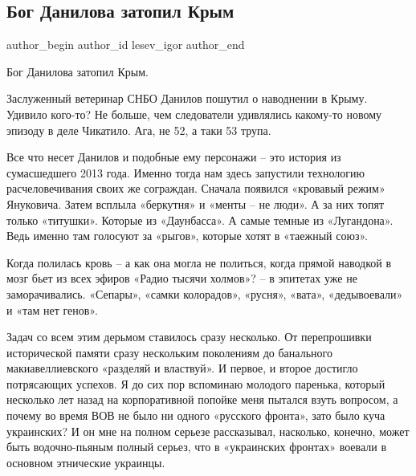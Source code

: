  
 
 
 
 
 
\subsection{Бог Данилова затопил Крым}
\label{sec:20_06_2021.fb.lesev_igor.1.bog_danilova_krym}
\ifcmt
 author_begin
   author_id lesev_igor
 author_end
\fi

Бог Данилова затопил Крым.

Заслуженный ветеринар СНБО Данилов пошутил о наводнении в Крыму. Удивило
кого-то? Не больше, чем следователи удивлялись какому-то новому эпизоду в деле
Чикатило. Ага, не 52, а таки 53 трупа.

Все что несет Данилов и подобные ему персонажи – это история из сумасшедшего
2013 года. Именно тогда нам здесь запустили технологию расчеловечивания своих
же сограждан. Сначала появился «кровавый режим» Януковича. Затем всплыла
«беркутня» и «менты – не люди». А за них топят только «титушки». Которые из
«Даунбасса». А самые темные из «Лугандона». Ведь именно там голосуют за
«рыгов», которые хотят в «таежный союз».

Когда полилась кровь – а как она могла не политься, когда прямой наводкой в
мозг бьет из всех эфиров «Радио тысячи холмов»? – в эпитетах уже не
заморачивались. «Сепары», «самки колорадов», «русня», «вата», «дедывоевали» и
«там нет генов».

Задач со всем этим дерьмом ставилось сразу несколько. От перепрошивки
исторической памяти сразу нескольким поколениям до банального макиавеллиевского
«разделяй и властвуй». И первое, и второе достигло потрясающих успехов. Я до
сих пор вспоминаю молодого паренька, который несколько лет назад на
корпоративной попойке меня пытался взуть вопросом, а почему во время ВОВ не
было ни одного «русского фронта», зато было куча украинских? И он мне на полном
серьезе рассказывал, насколько, конечно, может быть водочно-пьяным полный
серьез, что в «украинских фронтах» воевали в основном этнические украинцы.

